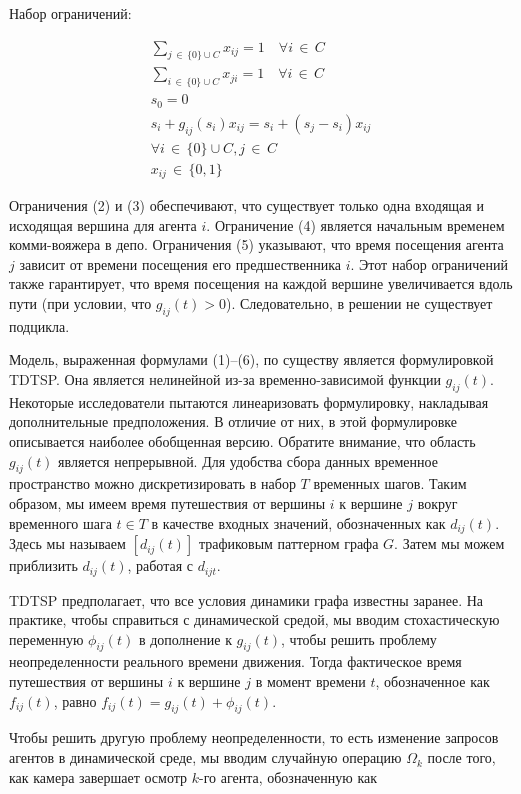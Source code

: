 Набор ограничений:


\begin{align}
\sum_{j \, \in \, \{ 0 \}\cup C} x_{ij} = 1 \quad  \forall i \, \in \, C \\
\sum_{i \, \in \, \{ 0 \}\cup C} x_{ji} =1 \quad  \forall i \, \in \, C \\
s_{0} = 0 \\
s_{i} + g_{ij}(s_{i})x_{ij} = s_{i} + (s_{j}-s_{i})x_{ij} \\
\forall i \, \in \, \{ 0 \} \cup C, j \, \in \, C \\
x_{ij} \, \in \, \{ 0,1 \} 
\end{align}


Ограничения (2) и (3) обеспечивают, что существует только одна входящая и исходящая вершина для агента $ i $. Ограничение (4) является начальным временем комми-вояжера в депо. Ограничения (5) указывают, что время посещения агента $ j $ зависит от времени посещения его предшественника $ i $. Этот набор ограничений также гарантирует, что время посещения на каждой вершине увеличивается вдоль пути (при условии, что $ g_{ij}(t)>0 $). Следовательно, в решении не существует подцикла.

Модель, выраженная формулами (1)–(6), по существу является формулировкой TDTSP. Она является нелинейной из-за временно-зависимой функции $ g_{ij} (t) $. Некоторые исследователи пытаются линеаризовать формулировку, накладывая дополнительные предположения. В отличие от них, в этой формулировке описывается наиболее обобщенная версию. Обратите внимание, что область $ g_{ij}(t) $ является непрерывной. Для удобства сбора данных временное пространство можно дискретизировать в набор $ T $ временных шагов. Таким образом, мы имеем время путешествия от вершины $ i $ к вершине $ j $ вокруг временного шага $ t \in T $ в качестве входных значений, обозначенных как $ d_{ij}(t) $. Здесь мы называем $ [d_{ij}(t)] $ трафиковым паттерном графа $ G $. Затем мы можем приблизить $ d_{ij}(t) $, работая с $ d_{ijt} $.

TDTSP предполагает, что все условия динамики графа известны заранее. На практике, чтобы справиться с динамической средой, мы вводим стохастическую переменную $ \phi_{ij}(t) $ в дополнение к $ g_{ij}(t) $, чтобы решить проблему неопределенности реального времени движения. Тогда фактическое время путешествия от вершины $ i $ к вершине $ j $ в момент времени $ t $, обозначенное как $ f_{ij}(t) $, равно $ f_{ij}(t) = g_{ij}(t) + \phi_{ij}(t) $. 

Чтобы решить другую проблему неопределенности, то есть изменение запросов агентов в динамической среде, мы вводим случайную операцию $ \Omega_{k} $ после того, как камера завершает осмотр $ k $-го агента, обозначенную как

